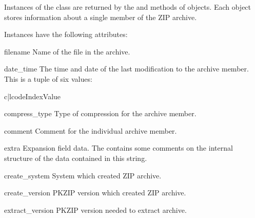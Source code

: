 Instances of the  class are returned by the
 and  methods of
 objects.  Each object stores information about a
single member of the ZIP archive.

Instances have the following attributes:

\begin{memberdesc}[ZipInfo]{filename}
  Name of the file in the archive.
\end{memberdesc}

\begin{memberdesc}[ZipInfo]{date_time}
  The time and date of the last modification to the archive
  member.  This is a tuple of six values:

\begin{tableii}{c|l}{code}{Index}{Value}
\end{tableii}
\end{memberdesc}

\begin{memberdesc}[ZipInfo]{compress_type}
  Type of compression for the archive member.
\end{memberdesc}

\begin{memberdesc}[ZipInfo]{comment}
  Comment for the individual archive member.
\end{memberdesc}

\begin{memberdesc}[ZipInfo]{extra}
  Expansion field data.  The
   contains some comments on the internal
  structure of the data contained in this string.
\end{memberdesc}

\begin{memberdesc}[ZipInfo]{create_system}
  System which created ZIP archive.
\end{memberdesc}

\begin{memberdesc}[ZipInfo]{create_version}
  PKZIP version which created ZIP archive.
\end{memberdesc}

\begin{memberdesc}[ZipInfo]{extract_version}
  PKZIP version needed to extract archive.
\end{memberdesc}

